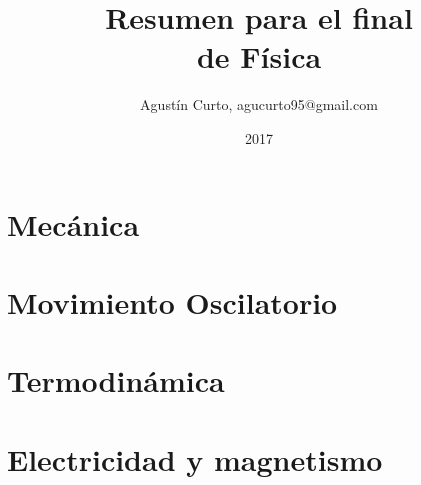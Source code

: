 \documentclass[12pt,a4paper]{article}
\author{Agustín Curto, agucurto95@gmail.com}
\title{Resumen para el final \\ de Física}
\date{2017}
\newcommand{\PN}{\par\noindent}
\begin{document}

	\part{Mecánica}
		
		
		
		
		
		
		
		
		
		

	\part{Movimiento Oscilatorio}
		
		
		
		
		

	\part{Termodinámica}
		
		
		
		
		
		
		
		
		

	\part{Electricidad y magnetismo}
		
		
		
		
		
		
\end{document}
